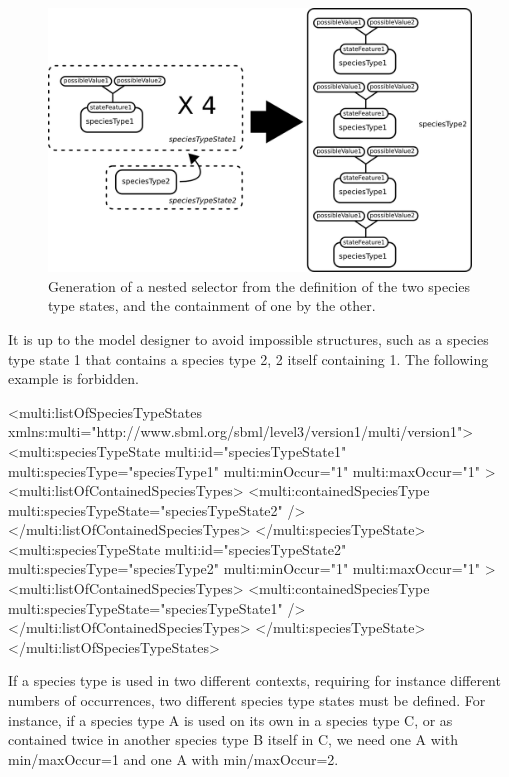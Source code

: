 \begin{figure}[H]
\begin{center}
\includegraphics[scale=0.7]{figs/pngs/ex_sts.png} 
\caption{Generation of a nested selector from the definition of the two species type states, and the containment of one by the other.}
\label{fig:ex_sts}
\end{center}
\end{figure}

It is up to the model designer to avoid impossible structures, such as a species type state 1 that contains a species type 2, 2 itself containing 1. The following example is forbidden.

\color{red}
\begin{example}
<multi:listOfSpeciesTypeStates
                  xmlns:multi="http://www.sbml.org/sbml/level3/version1/multi/version1">
  <multi:speciesTypeState multi:id="speciesTypeState1" multi:speciesType="speciesType1" 
                          multi:minOccur="1" multi:maxOccur="1" >
    <multi:listOfContainedSpeciesTypes>
      <multi:containedSpeciesType multi:speciesTypeState="speciesTypeState2" />
    </multi:listOfContainedSpeciesTypes>
  </multi:speciesTypeState>
  <multi:speciesTypeState multi:id="speciesTypeState2" multi:speciesType="speciesType2"
                          multi:minOccur="1" multi:maxOccur="1" >
    <multi:listOfContainedSpeciesTypes>
      <multi:containedSpeciesType multi:speciesTypeState="speciesTypeState1" />
    </multi:listOfContainedSpeciesTypes>
  </multi:speciesTypeState>
</multi:listOfSpeciesTypeStates>
\end{example}
\normalcolor

If a species type is used in two different contexts, requiring for instance different numbers of occurrences,  two different species type states must be defined. For instance, if a species type A is used on its own in a species type C, or as contained twice in another species type B itself in C,  we need one A with min/maxOccur=1 and one A with min/maxOccur=2.

